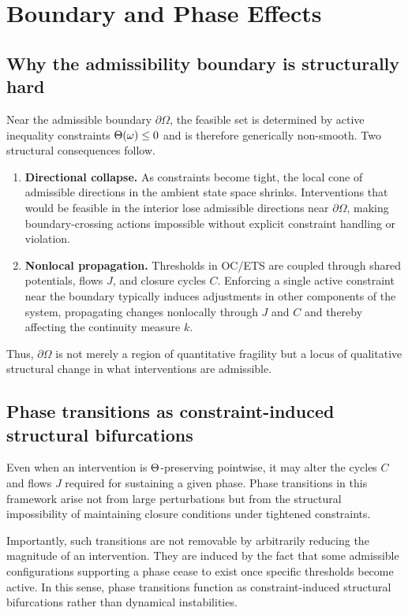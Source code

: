 ﻿\section{Boundary and Phase Effects}

\subsection{Why the admissibility boundary is structurally hard}

Near the admissible boundary $\partial\Omega$, the feasible set is determined by
active inequality constraints $\Theta(\omega)\le 0$ and is therefore
generically non-smooth.
Two structural consequences follow.

\begin{enumerate}
\item \textbf{Directional collapse.}
As constraints become tight, the local cone of admissible directions in the
ambient state space shrinks.
Interventions that would be feasible in the interior lose admissible directions
near $\partial\Omega$, making boundary-crossing actions impossible without
explicit constraint handling or violation.

\item \textbf{Nonlocal propagation.}
Thresholds in OC/ETS are coupled through shared potentials, flows $J$, and
closure cycles $C$.
Enforcing a single active constraint near the boundary typically induces
adjustments in other components of the system, propagating changes nonlocally
through $J$ and $C$ and thereby affecting the continuity measure $k$.
\end{enumerate}

Thus, $\partial\Omega$ is not merely a region of quantitative fragility but a
locus of qualitative structural change in what interventions are admissible.

\subsection{Phase transitions as constraint-induced structural bifurcations}

Even when an intervention is $\Theta$-preserving pointwise, it may alter the
cycles $C$ and flows $J$ required for sustaining a given phase.
Phase transitions in this framework arise not from large perturbations but from
the structural impossibility of maintaining closure conditions under tightened
constraints.

Importantly, such transitions are not removable by arbitrarily reducing the
magnitude of an intervention.
They are induced by the fact that some admissible configurations supporting a
phase cease to exist once specific thresholds become active.
In this sense, phase transitions function as constraint-induced structural
bifurcations rather than dynamical instabilities.

